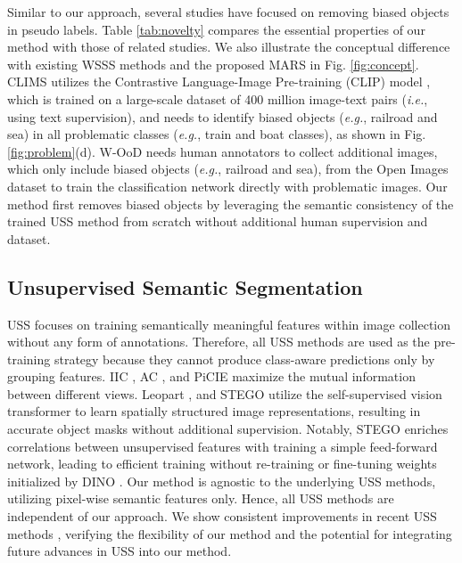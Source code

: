 \documentclass[10pt,twocolumn,letterpaper]{article}
\begin{document}
Similar to our approach, several studies \cite{lee2022weakly, xie2022clims} have focused on removing biased objects in pseudo labels. Table \ref{tab:novelty} compares the essential properties of our method with those of related studies. We also illustrate the conceptual difference with existing WSSS methods \cite{xie2022clims, lee2022weakly} and the proposed MARS in Fig. \ref{fig:concept}. CLIMS \cite{xie2022clims} utilizes the Contrastive Language-Image Pre-training (CLIP) model \cite{radford2021learning}, which is trained on a large-scale dataset of 400 million image-text pairs (\emph{i.e.}, using text supervision), and needs to identify biased objects (\emph{e.g.}, railroad and sea) in all problematic classes (\emph{e.g.}, train and boat classes), as shown in Fig. \ref{fig:problem}(d). W-OoD \cite{lee2022weakly} needs human annotators to collect additional images, which only include biased objects (\emph{e.g.}, railroad and sea), from the Open Images dataset \cite{kuznetsova2020open} to train the classification network directly with problematic images. Our method first removes biased objects by leveraging the semantic consistency of the trained USS method from scratch without additional human supervision and dataset. 

\subsection{Unsupervised Semantic Segmentation}\label{sec:uss}





USS focuses on training semantically meaningful features within image collection without any form of annotations. Therefore, all USS methods \cite{caron2018deep, ji2019invariant, ouali2020autoregressive, cho2021picie, van2021unsupervised, van2022discovering, ziegler2022self, hamilton2022unsupervised} are used as the pre-training strategy because they cannot produce class-aware predictions only by grouping features. IIC \cite{ji2019invariant}, AC \cite{ouali2020autoregressive}, and PiCIE \cite{cho2021picie} maximize the mutual information between different views. Leopart \cite{ziegler2022self}, and STEGO \cite{hamilton2022unsupervised} utilize the self-supervised vision transformer to learn spatially structured image representations, resulting in accurate object masks without additional supervision. Notably, STEGO \cite{hamilton2022unsupervised} enriches correlations between unsupervised features with training a simple feed-forward network, leading to efficient training without re-training or fine-tuning weights initialized by DINO \cite{caron2021emerging}. Our method is agnostic to the underlying USS methods, utilizing pixel-wise semantic features only. Hence, all USS methods are independent of our approach. We show consistent improvements in recent USS methods \cite{ziegler2022self, hamilton2022unsupervised}, verifying the flexibility of our method and the potential for integrating future advances in USS into our method.
\end{document}
